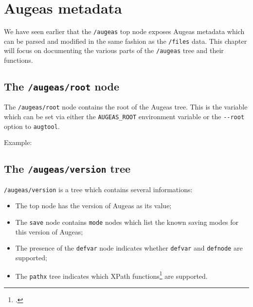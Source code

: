 \chapter{Augeas metadata}

\label{chap:metadata}

We have seen earlier that the \nolinkurl{/augeas} top node exposes Augeas metadata which can be parsed and modified in the same fashion as the \nolinkurl{/files} data. This chapter will focus on documenting the various parts of the \nolinkurl{/augeas} tree and their functions.

\section{The \texttt{/augeas/root} node}

  

The \nolinkurl{/augeas/root} node contains the root of the Augeas tree. This is the variable which can be set via either the \verb!AUGEAS_ROOT! environment variable or the \verb!--root! option to \verb!augtool!.


Example:


\begin{quote}

\end{quote}
\section{The \texttt{/augeas/version} tree}


\nolinkurl{/augeas/version} is a tree which contains several informations:

\begin{itemize}
\item
  The top node has the version of Augeas as its value;
\item
  The \verb!save! node contains \verb!mode! nodes which list the known saving modes for this version of Augeas;
\item
  The presence of the \verb!defvar! node indicates whether \verb!defvar! and \verb!defnode! are supported;
\item
  The \verb!pathx! tree indicates which XPath functions\footnote{.} are supported.
\end{itemize}


